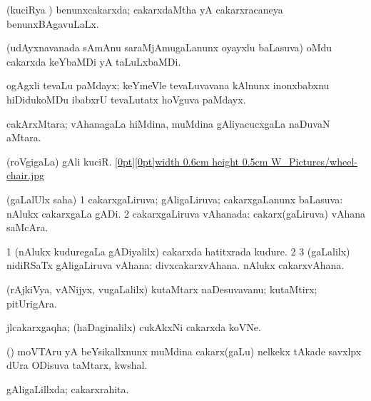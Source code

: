 {{{{{{\bentry
{} 
\gl{\gu}
\expl{}
\bmng
(kuciRya \vi) benunxcakarxda; cakarxdaMtha yA cakarxracaneya benunxBAgavuLaLx. 
\emng
\eentry

\bentry
{} 
\gl{\nA}
\expl{}
\bmng
(udAyxnavanada sAmAnu saraMjAmugaLanunx oyayxlu baLasuva) oMdu cakarxda keYbaMDi yA taLuLxbaMDi. 
\emng

\noindent 
\gl{\pagu}
\expl{}
\bmng
{} ogAgxli tevaLu paMdayx; keYmeVle tevaLuvavana kAlnunx inonxbabxnu hiDidukoMDu ibabxrU tevaLutatx hoVguva paMdayx. 
\emng
\eentry

\bentry
{} 
\gl{\nA}
\expl{}
\bmng
cakArxMtara; vAhanagaLa hiMdina, muMdina gAliyacucxgaLa naDuvaN aMtara. 
\emng
\eentry

\bentry
{} 
\gl{\nA}
\expl{}
\bmng
(roVgigaLa) gAli kuciR. \quad \hyperlink{wheel-chairfigure}{\raisebox{-0.15cm}[0pt][0pt]{\pdfimage width 0.6cm height 0.5cm {W_Pictures/wheel-chair.jpg}}} 
\emng
\eentry

\bentry
{} 
\gl{\gu}
\expl{}
\bmng
(\saMpa gaLalUlx saha) 
\bnum
\num{1} cakarxgaLiruva; gAligaLiruva; cakarxgaLanunx baLasuva:  nAlukx cakarxgaLa gADi. 
\num{2} cakarxgaLiruva vAhanada:  cakarx(gaLiruva) vAhana saMcAra. 
\enum
\emng
\eentry

\bentry
{} 
\gl{\nA}
\expl{}
\bmng
\bnum
\num{1} (nAlukx kuduregaLa gADiyalilx) cakarxda hatitxrada kudure. 
\num{2}  
\num{3} (\saMpa gaLalilx) nidiRSaTx gAligaLiruva vAhana:  divxcakarxvAhana.  nAlukx cakarxvAhana. 
\enum
\emng
\eentry

\bentry
{} 
\gl{\nA}
\expl{}
\bmng
(rAjkiVya, vANijyx, \mo vugaLalilx) kutaMtarx naDesuvavanu; kutaMtirx; pitUrigAra. 
\emng
\eentry

\bentry
{} 
\gl{\nA}
\expl{}
\bmng
jlcakarxgaqha; (haDaginalilx) cukAkxNi cakarxda koVNe. 
\emng
\eentry

\bentry
{} 
\gl{\nA}
\expl{}
\bmng
(\ashi) moVTAru yA beYsikallxnunx muMdina cakarx(gaLu) nelkekx tAkade savxlpx dUra ODisuva taMtarx, kwshal. 
\emng
\eentry

\bentry
{} 
\gl{\gu}
\expl{}
\bmng
gAligaLillxda; cakarxrahita. 
\emng
\eentry

}}}}}}
